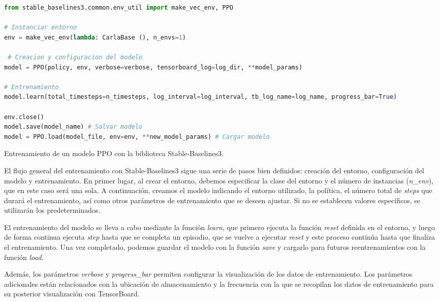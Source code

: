 \begin{code}[h] \begin{lstlisting}[language=Python] 
from stable_baselines3.common.env_util import make_vec_env, PPO

# Instanciar entorno
env = make_vec_env(lambda: CarlaBase (), n_envs=1) 

 # Creacion y configuracion del modelo
model = PPO(policy, env, verbose=verbose, tensorboard_log=log_dir, **model_params)

# Entrenamiento
model.learn(total_timesteps=n_timesteps, log_interval=log_interval, tb_log_name=log_name, progress_bar=True) 

env.close()
model.save(model_name) # Salvar modelo
model = PPO.load(model_file, env=env, **new_model_params) # Cargar modelo
\end{lstlisting}
\caption[Ejemplo de código con Stable-Baselines3]{Entrenamiento de un modelo \ac{PPO} con la biblioteca Stable-Baselines3.} 
\label{cod:sb3} \end{code} 

El flujo general del entrenamiento con Stable-Baselines3 sigue una serie de pasos bien definidos: creación del entorno, configuración del modelo y entrenamiento. En primer lugar, al crear el entorno, debemos especificar la clase del entorno y el número de instancias (\textit{n\_env}), que en este caso será una sola. A continuación, creamos el modelo indicando el entorno utilizado, la política, el número total de \textit{steps} que durará el entrenamiento, así como otros parámetros de entrenamiento que se deseen ajustar. Si no se establecen valores específicos, se utilizarán los predeterminados.

El entrenamiento del modelo se lleva a cabo mediante la función \textit{learn}, que primero ejecuta la función \textit{reset} definida en el entorno, y luego de forma continua ejecuta \textit{step} hasta que se completa un episodio, que se vuelve a ejecutar \textit{reset} y este proceso continúa hasta que finaliza el entrenamiento. Una vez completado, podemos guardar el modelo con la función \textit{save} y cargarlo para futuros reentrenamientos con la función \textit{load}.

Además, los parámetros \textit{verbose} y \textit{progress\_bar} permiten configurar la visualización de los datos de entrenamiento. Los parámetros adicionales están relacionados con la ubicación de almacenamiento y la frecuencia con la que se recopilan los datos de entrenamiento para su posterior visualización con TensorBoard.

